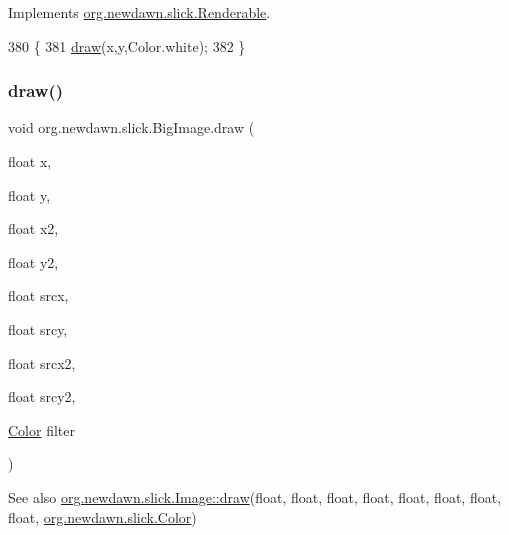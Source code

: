 Implements \mbox{\hyperlink{interfaceorg_1_1newdawn_1_1slick_1_1_renderable_a26cbac11f8309c268035688dfbf7203d}{org.\+newdawn.\+slick.\+Renderable}}.


\begin{DoxyCode}
380                                        \{
381         \mbox{\hyperlink{classorg_1_1newdawn_1_1slick_1_1_big_image_a75b5b008adf93b038aa56e9cfefd1a1c}{draw}}(x,y,Color.white);
382     \}
\end{DoxyCode}
\mbox{\label{classorg_1_1newdawn_1_1slick_1_1_big_image_aacb04eeb8ea255d9cddad0d9915dfc06}} 
\subsubsection{\texorpdfstring{draw()}{draw()}\hspace{0.1cm}{\footnotesize\ttfamily [10/10]}}
{\footnotesize\ttfamily void org.\+newdawn.\+slick.\+Big\+Image.\+draw (\begin{DoxyParamCaption}\item[{float}]{x,  }\item[{float}]{y,  }\item[{float}]{x2,  }\item[{float}]{y2,  }\item[{float}]{srcx,  }\item[{float}]{srcy,  }\item[{float}]{srcx2,  }\item[{float}]{srcy2,  }\item[{\mbox{\hyperlink{classorg_1_1newdawn_1_1slick_1_1_color}{Color}}}]{filter }\end{DoxyParamCaption})\hspace{0.3cm}{\ttfamily [inline]}}

\begin{DoxySeeAlso}{See also}
\mbox{\hyperlink{classorg_1_1newdawn_1_1slick_1_1_image_a9bddcca05c7140ab45df8ac5b250b6cd}{org.\+newdawn.\+slick.\+Image\+::draw}}(float, float, float, float, float, float, float, float, \mbox{\hyperlink{classorg_1_1newdawn_1_1slick_1_1_color}{org.\+newdawn.\+slick.\+Color}}) 
\end{DoxySeeAlso}

